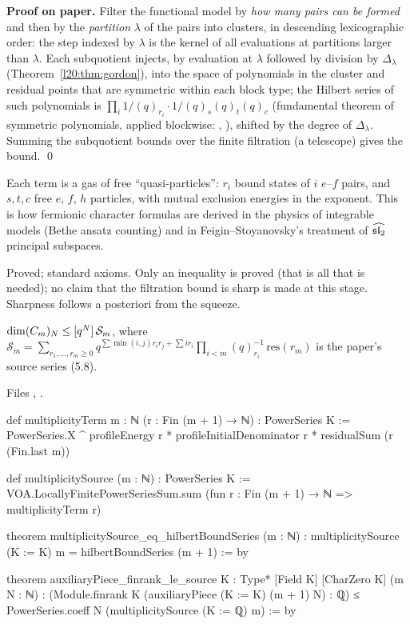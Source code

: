 \textbf{Proof on paper.} Filter the functional model by \emph{how many pairs can be formed} and then by the
\emph{partition} $\lambda$ of the pairs into clusters, in descending lexicographic order: the step indexed by $\lambda$
is the kernel of all evaluations at partitions larger than $\lambda$. Each subquotient injects, by evaluation at
$\lambda$ followed by division by $\Delta_\lambda$ (Theorem~\ref{l20:thm:gordon}), into the space of polynomials in the
cluster and residual points that are symmetric within each block type; the Hilbert series of such polynomials
is $\prod_i1/(q)_{r_i}\cdot1/(q)_s(q)_t(q)_c$ (fundamental theorem of symmetric polynomials, applied blockwise:
, ), shifted by the degree of
$\Delta_\lambda$. Summing the subquotient bounds over the finite filtration (a telescope) gives the bound. \qed

\begin{physics}
Each term is a gas of free ``quasi-particles'': $r_i$ bound states of $i$ $e$--$f$ pairs, and $s,t,c$ free
$e$, $f$, $h$ particles, with mutual exclusion energies in the exponent. This is how fermionic character
formulas are derived in the physics of integrable models (Bethe ansatz counting) and in Feigin--Stoyanovsky's
treatment of $\widehat{\mathfrak{sl}_2}$ principal subspaces.
\end{physics}

\begin{status}
Proved; standard axioms. Only an inequality is proved (that is all that is needed); no claim that the
filtration bound is sharp is made at this stage. Sharpness follows a posteriori from the squeeze.
\end{status}

\begin{theorem}\label{l20:thm:auxbound}
$\dim(C_m)_N\le[q^N]\,\mathcal S_m$, where $\mathcal S_m=\sum_{r_1,\dots,r_m\ge0}q^{\sum\min(i,j)r_ir_j+\sum ir_i}
\prod_{i<m}(q)_{r_i}^{-1}\,\mathrm{res}(r_m)$ is the paper's source series (5.8).
\end{theorem}
\noindent Files ,
.
\begin{leancode}
def multiplicityTerm {m : ℕ} (r : Fin (m + 1) → ℕ) : PowerSeries K :=
  PowerSeries.X ^ profileEnergy r * profileInitialDenominator r * residualSum (r (Fin.last m))

def multiplicitySource (m : ℕ) : PowerSeries K :=
  VOA.LocallyFinitePowerSeriesSum.sum (fun r : Fin (m + 1) → ℕ => multiplicityTerm r)

theorem multiplicitySource_eq_hilbertBoundSeries (m : ℕ) :
    multiplicitySource (K := K) m = hilbertBoundSeries (m + 1) := by

theorem auxiliaryPiece_finrank_le_source {K : Type*} [Field K] [CharZero K] (m N : ℕ) :
    (Module.finrank K (auxiliaryPiece (K := K) (m + 1) N) : ℚ) ≤
      PowerSeries.coeff N (multiplicitySource (K := ℚ) m) := by
\end{leancode}


